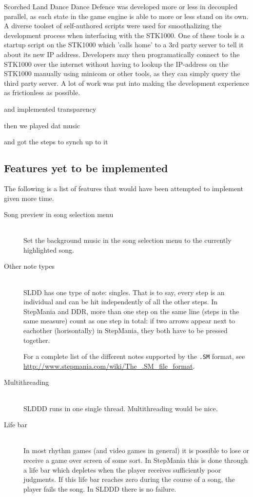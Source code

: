 Scorched Land Dance Dance Defence was developed more or less in decoupled parallel, as each state in the game engine is able to more or less stand on its own.
A diverse toolset of self-authored scripts were used for smoothalizing the development process when interfacing with the STK1000.
One of these tools is a startup script on the STK1000 which 'calls home' to a 3rd party server to tell it about its new IP address.
Developers may then programatically connect to the STK1000 over the internet without having to lookup the IP-address on the STK1000 manually using minicom or other tools, as they can simply query the third party server.
A lot of work was put into making the development experience as frictionless as possible.



and implemented transparency

then we played dat music

and got the steps to synch up to it


\subsection{Features yet to be implemented}
	The following is a list of features that would have been attempted to implement given more time.

	\begin{description}	
		\item[Song preview in song selection menu] \hfill \\
			Set the background music in the song selection menu to the currently highlighted song.
		\item[Other note types] \hfill \\
			SLDD has one type of note: singles. That is to say, every step is an individual and can be hit independently of all the other steps.
			In StepMania and DDR, more than one step on the same line (steps in the same measure) count as one step in total: if two arrows appear next to eachother (horisontally) in StepMania, they both have to be pressed together.

			For a complete list of the different notes supported by the \texttt{.SM} format, see \url{http://www.stepmania.com/wiki/The_.SM_file_format}.
		\item[Multithreading] \hfill \\
			SLDDD runs in one single thread.
			Multithreading would be nice.
		\item[Life bar] \hfill \\
			In most rhythm games (and video games in general) it is possible to lose or receive a game over screen of some sort.
			In StepMania this is done through a life bar which depletes when the player receives sufficiently poor judgments.
			If this life bar reaches zero during the course of a song, the player fails the song.
			In SLDDD there is no failure.
	\end{description}



